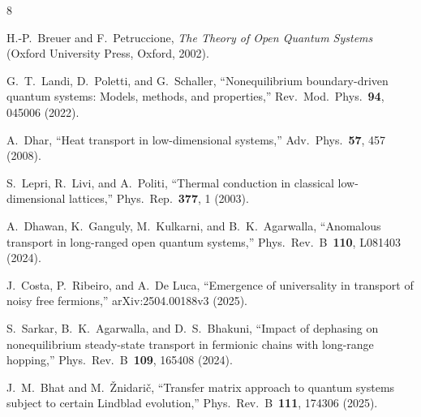 \documentclass[aps,prb,twocolumn,superscriptaddress,floatfix]{revtex4-2}
\begin{document}
\begin{thebibliography}{8}

H.-P.\ Breuer and F.\ Petruccione,
\textit{The Theory of Open Quantum Systems}
(Oxford University Press, Oxford, 2002).

G.~T.\ Landi, D.\ Poletti, and G.\ Schaller,
``Nonequilibrium boundary-driven quantum systems: Models, methods, and properties,''
Rev.\ Mod.\ Phys.\ \textbf{94}, 045006 (2022).

A.\ Dhar,
``Heat transport in low-dimensional systems,''
Adv.\ Phys.\ \textbf{57}, 457 (2008).

S.\ Lepri, R.\ Livi, and A.\ Politi,
``Thermal conduction in classical low-dimensional lattices,''
Phys.\ Rep.\ \textbf{377}, 1 (2003).

A.\ Dhawan, K.\ Ganguly, M.\ Kulkarni, and B.~K.\ Agarwalla,
``Anomalous transport in long-ranged open quantum systems,''
Phys.\ Rev.\ B\ \textbf{110}, L081403 (2024).

J.\ Costa, P.\ Ribeiro, and A.\ De Luca,
``Emergence of universality in transport of noisy free fermions,''
arXiv:2504.00188v3 (2025).

S.\ Sarkar, B.~K.\ Agarwalla, and D.~S.\ Bhakuni,
``Impact of dephasing on nonequilibrium steady-state transport in fermionic chains with long-range hopping,''
Phys.\ Rev.\ B\ \textbf{109}, 165408 (2024).

J.~M.\ Bhat and M.\ \v{Z}nidari\v{c},
``Transfer matrix approach to quantum systems subject to certain Lindblad evolution,''
Phys.\ Rev.\ B\ \textbf{111}, 174306 (2025).

\end{thebibliography}
\end{document}
